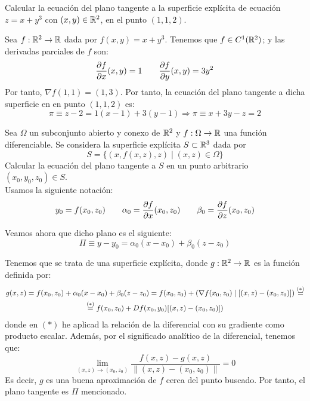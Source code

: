 \begin{ejercicio}
    Calcular la ecuación del plano tangente a la superficie explícita de ecuación $z = x + y^3$ con $(x,y)\in\mathbb{R}^2$, en el punto $(1,1,2)$.

    Sea $f:\mathbb{R}^2\to \mathbb{R}$ dada por $f(x,y) = x+y^3$. Tenemos que $f\in C^1(\mathbb{R}^2)$; y las derivadas parciales de $f$ son:
    \begin{equation*}
        \frac{\partial f}{\partial x}(x,y) = 1
        \qquad 
        \frac{\partial f}{\partial y}(x,y) = 3y^2
    \end{equation*}
    Por tanto, $\nabla f(1,1)=(1,3)$. Por tanto, la ecuación del plano tangente a dicha superficie en en punto $(1,1,2)$ es:
    \begin{equation*}
        \pi\equiv z-2 = 1(x-1) + 3(y-1) \Longrightarrow \pi\equiv x+3y-z=2
    \end{equation*}
\end{ejercicio}

\begin{ejercicio}
    Sea $\Omega$ un subconjunto abierto y conexo de $\mathbb{R}^2$ y $f:\Omega\to \mathbb{R}$ una función diferenciable. Se considera la superficie explícita $S\subset \mathbb{R}^3$ dada por
    \begin{equation*}
        S=\{(x,f(x,z), z)\mid (x,z)\in \Omega\}
    \end{equation*}
    Calcular la ecuación del plano tangente a $S$ en un punto arbitrario $(x_0,y_0,z_0)\in S$.\\

    Usamos la siguiente notación:
    \begin{equation*}
        y_0=f(x_0,z_0) \qquad \alpha_0 = \frac{\partial f}{\partial x}(x_0, z_0) \qquad \beta_0 = \frac{\partial f}{\partial z}(x_0, z_0)
    \end{equation*}

    Veamos ahora que dicho plano es el siguiente:
    \begin{equation*}
        \Pi \equiv y-y_0 = \alpha_0(x-x_0) + \beta_0(z-z_0)
    \end{equation*}

    Tenemos que se trata de una superficie explícita, donde $g:\mathbb{R}^2\to \mathbb{R}$ es la función definida por:
    \begin{multline*}
        g(x,z) = f(x_0,z_0) + \alpha_0(x-x_0) + \beta_0(z-z_0) = f(x_0,z_0) + (\nabla f(x_0,z_0)\mid [(x,z) - (x_0,z_0)]) \stackrel{(\ast)}{=}\\
        \stackrel{(\ast)}{=} f(x_0,z_0) + Df(x_0,y_0)[(x,z) - (x_0,z_0)])
    \end{multline*}
    donde en $(\ast)$ he aplicad la relación de la diferencial con su gradiente como producto escalar. Además, por el significado analítico de la diferencial, tenemos que:
    \begin{equation*}
        \lim_{(x,z)\to (x_0,z_0)} \frac{f(x,z) - g(x,z)}{\|(x,z)-(x_0,z_0)\|} = 0
    \end{equation*}
    Es decir, $g$ es una buena aproximación de $f$ cerca del punto buscado. Por tanto, el plano tangente es $\Pi$ mencionado.
\end{ejercicio}


